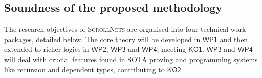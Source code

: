\documentclass[12pt,draftproposal]{msca-pf}
\newcommand{\proj}{\small\textsc{ScrollNets}}
\newcommand{\KO}[1]{$\mathsf{KO#1}$}
\newcommand{\WP}[1]{$\mathsf{WP#1}$}
\begin{document}



\subsection{Soundness of the proposed methodology}
\label{ssc:excellence:methodology}


The research objectives of {\proj} are organised into four technical work packages, detailed below.
The core theory will be developed in \WP{1} and then extended to richer logics in \WP{2}, \WP{3} and
\WP{4}, meeting \KO{1}. \WP{3} and \WP{4} will deal with crucial features found in SOTA proving and
programming systems like recursion and dependent types, contributing to \KO{2}.
\end{document}
